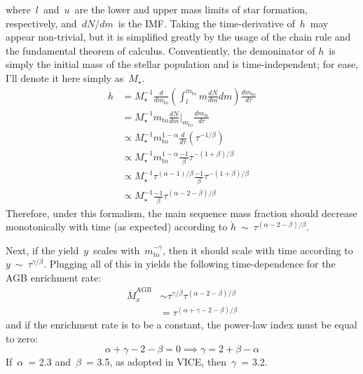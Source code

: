 \documentclass[\main/notes.tex]{subfiles}
\begin{document}
where~$l$~and~$u$~are the lower and upper mass limits of star formation, 
respectively, and~$dN/dm$~is the IMF. Taking the time-derivative of~$h$~may 
appear non-trivial, but it is simplified greatly by the usage of the chain 
rule and the fundamental theorem of calculus. Conventiently, the demoninator of 
$h$~is simply the initial mass of the stellar population and is 
time-independent; for ease, I'll denote it here simply as~$M_\star$. 
\begin{subequations}\begin{align} 
\dot{h} &= M_\star^{-1} \frac{d}{dm_\text{to}} 
\left(\int_l^{m_\text{to}} m\frac{dN}{dm} dm\right) 
\frac{dm_\text{to}}{d\tau} 
\\ 
&= M_\star^{-1} m_\text{to} \frac{dN}{dm}\Big|_{m_\text{to}} 
\frac{dm_\text{to}}{d\tau} 
\\ 
&\propto M_\star^{-1} m_\text{to}^{1 - \alpha} \frac{d}{d\tau}(\tau^{-1/\beta}) 
\\ 
&\propto M_\star^{-1} m_\text{to}^{1 - \alpha} \frac{-1}{\beta} 
\tau^{-(1 + \beta)/\beta} 
\\ 
&\propto M_\star^{-1} \tau^{(\alpha - 1) / \beta} \frac{-1}{\beta} 
\tau^{-(1 + \beta)/\beta} 
\\ 
&\propto M_\star^{-1} \frac{-1}{\beta} \tau^{(\alpha - 2 - \beta)/\beta} 
\end{align}\end{subequations} 
Therefore, under this formalism, the main sequence mass fraction should 
decrease monotonically with time (as expected) according to 
$\dot{h}~\sim~\tau^{(\alpha - 2 - \beta) / \beta}$. 
\par 
Next, if the yield~$y$~scales with~$m_\text{to}^{-\gamma}$, then it should 
scale with time according to~$y~\sim~\tau^{\gamma/\beta}$. Plugging all of this 
in yields the following time-dependence for the AGB enrichment rate: 
\begin{subequations}\begin{align} 
\dot{M}_x^\text{AGB} &\sim \tau^{\gamma/\beta} 
\tau^{(\alpha - 2 - \beta) / \beta} 
\\ 
&= \tau^{(\alpha + \gamma - 2 - \beta) / \beta} 
\end{align}\end{subequations} 
and if the enrichment rate is to be a constant, the power-law index must be 
equal to zero: 
\begin{equation} 
\alpha + \gamma - 2 - \beta = 0 \implies \gamma = 2 + \beta - \alpha 
\end{equation} 
If~$\alpha$~= 2.3 and~$\beta$~= 3.5, as adopted in VICE, then~$\gamma$~= 3.2. 
\end{document}
